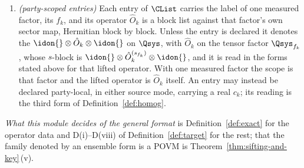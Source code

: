 \begin{definition}
\begin{enumerate}[label=(DX\arabic*),leftmargin=3.2em]
an ordered list of $L\ge1$ entries, each a
,
message $m$ carrying a sender $\pi_m\in\{\mathsf A,\mathsf B\}$, a finite
alphabet $\mathcal{C}_m$ and a total table
$a_m:\Oset{\pi_m}\times\mathcal{C}_1\times\dots\times\mathcal{C}_{m-1}
\to\mathcal{C}_m$. The joint announcement function is \emph{derived} from the
tables by composition,
\begin{equation}\label{eq:transcript}
  \kappa_m(x,v)\coloneqq a_m\big(\rd{\pi_m}(x,v),\,\kappa_1(x,v),\dots,
  \kappa_{m-1}(x,v)\big),\qquad
  a(x,v)\coloneqq\big(\kappa_m(x,v)\big)_{m=1}^{L}\in
  \Kann\coloneqq\prod_{m=1}^{L}\mathcal{C}_m ,
\end{equation}
and the acceptance-statistic map $\phi$, the sifting predicate $\varsigma$ of
\eqref{eq:chkey} and the holder's key map $r_{\hold}$ of D(viii) of
Definition~\ref{def:target} are maps on this $\Kann$. The two
maps $a_A$, $a_B$ of the basic format are the transcript protocol with $L=2$,
$\pi=(\mathsf A,\mathsf B)$, $\mathcal{C}_1=\CAset$, $\mathcal{C}_2=\CBset$,
$a_1=a_A$ and $a_2(o,\kappa_1)=a_B(o)$. A message is a function of its
sender's readout and of the earlier messages of the same round, and of
nothing else. No measurement of a round depends on a message of that round,
the measurements being the fixed families of (DX3) and (DX4); processing
across rounds is not a round message.
\item \emph{(party-scoped entries)} Each entry of $\CList$ carries the label
of one measured factor, its
$f_k$, and its operator $\hat O_k$ is a block list against that factor's own
sector map, Hermitian block by block. Unless the entry is declared
 it denotes the
$\idon{}\otimes\hat O_k\otimes\idon{}$ on $\Qsys$, with $\hat O_k$ on the
tensor factor $\Qsys_{f_k}$, whose $s$-block is
$\idon{}\otimes\hat O_k^{(s_{f_k})}\otimes\idon{}$, and it is read in the forms stated
above for that lifted operator. With one measured factor the scope is that
factor and the lifted operator is $\hat O_k$ itself. An entry may instead be
declared party-local, in either source mode, carrying a real $c_k$; its
reading is the third form of Definition~\ref{def:homog}.
\end{enumerate}

\emph{What this module decides of the general format} is
Definition~\ref{def:exact} for the operator data and D(i)--D(viii) of
Definition~\ref{def:target} for the rest; that the family denoted by an
ensemble form is a POVM is Theorem~\ref{thm:sifting-and-key}\,(v).
\end{definition}
